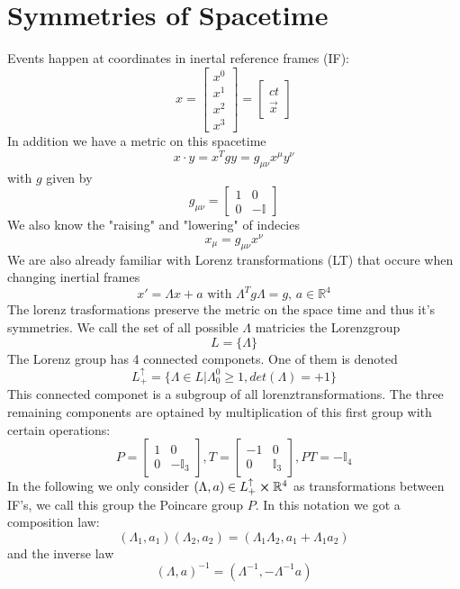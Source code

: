 \documentclass{report}
\begin{document}
\section{Symmetries of Spacetime}
Events happen at coordinates in inertal reference frames (IF): \[
x = \begin{bmatrix} x^0 \\ x^1 \\ x^2 \\ x^3 \end{bmatrix} = \begin{bmatrix} ct \\ \vec{x} \end{bmatrix} 
\] 
In addition we have a metric on this spacetime \[
  x\cdot y = x^T g y = g_{\mu\nu} x^\mu y^\nu
\] with $g$ given by \[
g_{\mu\nu} = \begin{bmatrix} 1 & 0 \\ 0 & -\mathbb{I} \end{bmatrix} 
\] 
We also know the "raising" and "lowering" of indecies \[
  x_\mu = g_{\mu\nu} x^\nu
\] 
We are also already familiar with Lorenz transformations (LT) that occure when changing inertial frames \[
  x' = \Lambda x + a \text{ with } \Lambda^T g \Lambda = g \text{, } a \in \mathbb{R}^4
\] 
The lorenz trasformations preserve the metric on the space time and thus it's symmetries. We call the set of all possible $\Lambda$ matricies the Lorenzgroup \[
  L = \{ \Lambda \}
\] The Lorenz group has 4 connected componets. One of them is denoted \[
L_+^\uparrow = \{\Lambda \in L | \Lambda^0_0 \ge 1, det\left( \Lambda  \right) = +1\}
\] This connected componet is a subgroup of all lorenztransformations. The three remaining components are optained by multiplication of this first group with certain operations: \[
P = \begin{bmatrix} 1 & 0 \\ 0 & -\mathbb{I}_3 \end{bmatrix} , T = \begin{bmatrix} -1 & 0 \\ 0 & \mathbb{I}_3 \end{bmatrix} , PT = -\mathbb{I}_4 
\] 
In the following we only consider $ \left( \Lambda, a \right) \in L_+^\uparrow \cross \mathbb{R}^4 $ as transformations between IF's, we call this group the Poincare group $P$. In this notation we got a composition law: \[
  \left( \Lambda_1, a_1 \right) \left( \Lambda_2, a_2 \right) = \left( \Lambda_1\Lambda_2, a_1+\Lambda_1 a_2 \right) 
\] and the inverse law \[
\left( \Lambda, a \right) ^{-1} = \left( \Lambda^{-1}, -\Lambda^{-1}a \right) 
\] 
\end{document}
